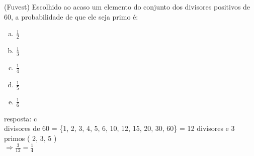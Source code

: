 \begin{ex}
 	(Fuvest) Escolhido ao acaso um elemento do conjunto dos divisores positivos de 60, a probabilidade de que ele seja primo é:
    \begin{enumerate}[(a)]
    \item $\frac{1}{2}$
    \item $\frac{1}{3}$
    \item $\frac{1}{4}$
    \item $\frac{1}{5}$
    \item $\frac{1}{6}$
    \end{enumerate}
      \begin{sol}
        resposta: c \\
        divisores de 60 = \{1, 2, 3, 4, 5, 6, 10, 12, 15, 20, 30, 60\} = 12 divisores e 3 primos ( 2, 3, 5 )\\
        $\Longrightarrow\frac{3}{12}=\frac{1}{4}$
      \end{sol}
\end{ex}
